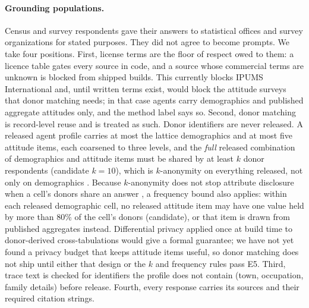 \documentclass[11pt]{article}
\begin{document}
\paragraph{Grounding populations.} Census and survey respondents gave their answers to statistical offices and survey organizations for stated purposes. They did not agree to become prompts. We take four positions. First, license terms are the floor of respect owed to them: a licence table gates every source in code, and a source whose commercial terms are unknown is blocked from shipped builds. This currently blocks IPUMS International and, until written terms exist, would block the attitude surveys that donor matching needs; in that case agents carry demographics and published aggregate attitudes only, and the method label says so. Second, donor matching is record-level reuse and is treated as such. Donor identifiers are never released. A released agent profile carries at most the lattice demographics and at most five attitude items, each coarsened to three levels, and the \emph{full} released combination of demographics and attitude items must be shared by at least $k$ donor respondents (candidate $k=10$), which is $k$-anonymity on everything released, not only on demographics \citep{sweeney2002kanonymity}. Because $k$-anonymity does not stop attribute disclosure when a cell's donors share an answer \citep{machanavajjhala2007ldiversity}, a frequency bound also applies: within each released demographic cell, no released attitude item may have one value held by more than 80\% of the cell's donors (candidate), or that item is drawn from published aggregates instead. Differential privacy applied once at build time to donor-derived cross-tabulations would give a formal guarantee; we have not yet found a privacy budget that keeps attitude items useful, so donor matching does not ship until either that design or the $k$ and frequency rules pass E5. Third, trace text is checked for identifiers the profile does not contain (town, occupation, family details) before release. Fourth, every response carries its sources and their required citation strings.
\end{document}
